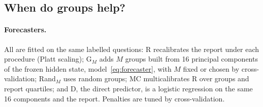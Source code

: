 \documentclass[11pt]{article}
\theoremstyle{definition}
\theoremstyle{remark}
\newcommand{\1}{\mathbf{1}}
\begin{document}
\subsection{When do groups help?}
\label{sec:e5}
\paragraph{Forecasters.} All are fitted on the same labelled questions: R recalibrates the report
under each procedure (Platt scaling); G$_M$ adds $M$ groups built from 16 principal components of the frozen
hidden state, model~\eqref{eq:forecaster}, with $M$ fixed or chosen by cross-validation; Rand$_M$ uses random
groups; MC multicalibrates R over groups and report quartiles; and D, the direct predictor, is a logistic
regression on the same 16 components and the report. Penalties are tuned by cross-validation.

\end{document}
